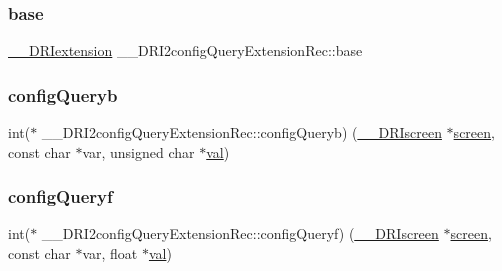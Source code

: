 \subsubsection{\texorpdfstring{base}{base}}
{\footnotesize\ttfamily \hyperlink{dri__interface_8h_a4e0a61c8ece00d2b2c6792a9a1b55385}{\+\_\+\+\_\+\+D\+R\+Iextension} \+\_\+\+\_\+\+D\+R\+I2config\+Query\+Extension\+Rec\+::base}

\mbox{\label{struct_____d_r_i2config_query_extension_rec_aad25692d89079390531ec18a3ec1d954}} 
\subsubsection{\texorpdfstring{config\+Queryb}{configQueryb}}
{\footnotesize\ttfamily int($\ast$ \+\_\+\+\_\+\+D\+R\+I2config\+Query\+Extension\+Rec\+::config\+Queryb) (\hyperlink{dri__interface_8h_a9961b01d421ee1fd6ed3c05acc9ca561}{\+\_\+\+\_\+\+D\+R\+Iscreen} $\ast$\hyperlink{cad_8h_ae04e09e4e3831bfc1632c509ae37dcec}{screen}, const char $\ast$var, unsigned char $\ast$\hyperlink{glcorearb_8h_a26942fd2ed566ef553eae82d2c109c8f}{val})}

\mbox{\label{struct_____d_r_i2config_query_extension_rec_a004f326f142167177768231cca4cd825}} 
\subsubsection{\texorpdfstring{config\+Queryf}{configQueryf}}
{\footnotesize\ttfamily int($\ast$ \+\_\+\+\_\+\+D\+R\+I2config\+Query\+Extension\+Rec\+::config\+Queryf) (\hyperlink{dri__interface_8h_a9961b01d421ee1fd6ed3c05acc9ca561}{\+\_\+\+\_\+\+D\+R\+Iscreen} $\ast$\hyperlink{cad_8h_ae04e09e4e3831bfc1632c509ae37dcec}{screen}, const char $\ast$var, float $\ast$\hyperlink{glcorearb_8h_a26942fd2ed566ef553eae82d2c109c8f}{val})}

